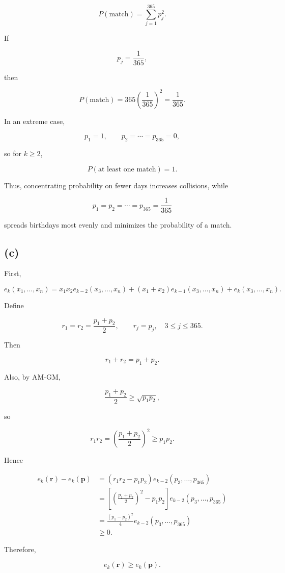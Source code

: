 \documentclass{article}
\begin{document}
\[
P(\text{match})
=
\sum_{j=1}^{365}p_j^2.
\]

If

\[
p_j=\frac1{365},
\]

then

\[
P(\text{match})
=
365\left(\frac1{365}\right)^2
=
\frac1{365}.
\]

In an extreme case,

\[
p_1=1,\qquad
p_2=\cdots=p_{365}=0,
\]

so for \(k\ge2\),

\[
P(\text{at least one match})=1.
\]

Thus, concentrating probability on fewer days increases collisions, while

\[
p_1=p_2=\cdots=p_{365}=\frac1{365}
\]

spreads birthdays most evenly and minimizes the probability of a match.

\subsection*{(c)}

First,

\[
e_k(x_1,\ldots,x_n)
=
x_1x_2e_{k-2}(x_3,\ldots,x_n)
+
(x_1+x_2)e_{k-1}(x_3,\ldots,x_n)
+
e_k(x_3,\ldots,x_n).
\]

Define

\[
r_1=r_2=\frac{p_1+p_2}{2},
\qquad
r_j=p_j,\quad 3\le j\le365.
\]

Then

\[
r_1+r_2=p_1+p_2.
\]

Also, by AM-GM,

\[
\frac{p_1+p_2}{2}\ge\sqrt{p_1p_2},
\]

so

\[
r_1r_2
=
\left(\frac{p_1+p_2}{2}\right)^2
\ge
p_1p_2.
\]

Hence

\[
\begin{aligned}
e_k(\mathbf r)-e_k(\mathbf p)
&=
(r_1r_2-p_1p_2)
e_{k-2}(p_3,\ldots,p_{365})\\
&=
\left[
\left(\frac{p_1+p_2}{2}\right)^2-p_1p_2
\right]
e_{k-2}(p_3,\ldots,p_{365})\\
&=
\frac{(p_1-p_2)^2}{4}
e_{k-2}(p_3,\ldots,p_{365})\\
&\ge0.
\end{aligned}
\]

Therefore,

\[
e_k(\mathbf r)\ge e_k(\mathbf p).
\]
\end{document}
